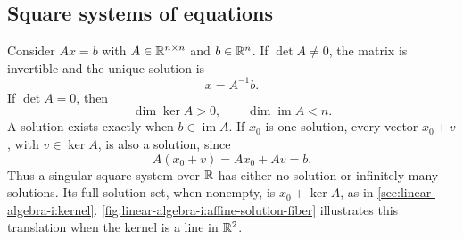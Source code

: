 \subsection{Square systems of equations}

Consider \(Ax=b\) with \(A\in\mathbb{R}^{n\times n}\) and \(b\in\mathbb{R}^n\).
If \(\det A\ne0\), the matrix is invertible and the unique solution is
\[
  x=A^{-1}b.
\]
If \(\det A=0\), then
\[
  \dim\ker A>0,\qquad \dim\operatorname{im}A<n.
\]
A solution exists exactly when \(b\in\operatorname{im}A\).
If \(x_0\) is one solution, every vector \(x_0+v\), with
\(v\in\ker A\), is also a solution, since
\[
  A(x_0+v)=Ax_0+Av=b.
\]
Thus a singular square system over \(\mathbb{R}\) has either no solution or
infinitely many solutions. Its full solution set, when nonempty, is
\(x_0+\ker A\), as in \autoref{sec:linear-algebra-i:kernel}.
\autoref{fig:linear-algebra-i:affine-solution-fiber} illustrates this
translation when the kernel is a line in \(\mathbb{R}^2\).
\begin{marginfigure}
  \centering
  
  \caption[A solution set as a translated kernel]{A real-plane schematic
    for a nonempty singular system. Moving from \(x_0\) by any kernel
    vector \(v\) gives another solution \(x_0+v\). The two lines are parallel.}
  \label{fig:linear-algebra-i:affine-solution-fiber}
\end{marginfigure}
